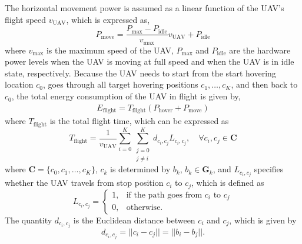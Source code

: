 \documentclass[journal]{IEEEtran}
\begin{document}
	The horizontal movement power is assumed as a linear function of the UAV's flight speed $v_{\text{UAV}}$, which is expressed as\cite{M. B. Ghorbel}, \cite{D. Hulens}
	\begin{equation}
	    P_{\text{move}} = \frac{P_{\text{max}}-P_{\text{idle}}}{v_{\text{max}}}v_{\text{UAV}} + P_{\text{idle}}
	\end{equation}
	where $v_{\text{max}}$ is the maximum speed of the UAV, $P_{\text{max}}$ and $P_{\text{idle}}$ are the hardware power levels when the UAV is moving at full speed and when the UAV is in idle state, respectively. Because the UAV needs to start from the start hovering location $c_0$, goes through all target hovering positions $c_1,\dots, c_K$, and then back to $c_{0}$, the total energy consumption of the UAV in flight is given by\cite{M. B. Ghorbel}, \cite{D. Hulens}
    \begin{eqnarray}
            E_{\text{flight}} = T_{\text{flight}}\left(P_{\text{hover}} + P_{\text{move}}\right)
    \end{eqnarray}
    where $T_{\text{flight}}$ is the total flight time, which can be expressed as
    \begin{equation}
        T_{\text{flight}} = \frac{1}{v_{\text{UAV}}}\sum_{i=0}^{K} \sum_{\substack{j=0 \\ j \neq i}}^{K} d_{c_{i},c_{j}}L_{c_{i},c_{j}},\quad \forall{c_i,c_j} \in {\bm{C}}
    \end{equation}
	where $\bm{C} = \{c_0,c_1,\dots, c_K\}$, $c_k$ is determined by $b_k$, $b_k \in \bm{G}_k$, and  $L_{c_i,c_j}$ specifies whether the UAV travels from stop position $c_i$ to $c_j$, which is defined as
	\begin{equation}
	\label{visit}
	L_{c_i,c_j} = \left\{ \begin{array}{ll}
	1,& \text{if the path goes from $c_i$ to $c_j$}\\
	0,& \text{otherwise}.
	\end{array} \right.
	\end{equation}
	The quantity $d_{c_i,c_j}$ is the Euclidean distance between $c_i$ and $c_j$, which is given by
	\begin{equation}
	d_{c_i,c_j} = ||c_i-c_j|| = ||b_i-b_j||.
	\end{equation}
\end{document}
